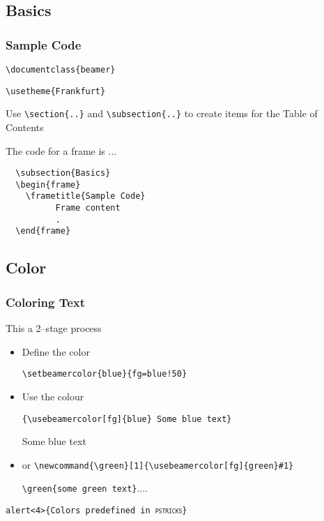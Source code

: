 \subsection{Basics}
\begin{frame}[fragile]
  \frametitle{Sample Code}
\verb+\documentclass{beamer}+
  
\verb+\usetheme{Frankfurt}+

  Use \verb+\section{..}+  and \verb+\subsection{..}+ to
create items for the Table of Contents

\alert<1>{The code for a frame is ...}
\begin{verbatim}
  \subsection{Basics}
  \begin{frame}
    \frametitle{Sample Code}
          Frame content
          .
  \end{frame}
\end{verbatim}
\end{frame}

\subsection{Color}

\begin{frame}[fragile]
  \frametitle{Coloring Text}
This a 2--stage process
\begin{itemize}
\item {\red Define} {\green the} {\blue color}

\verb+\setbeamercolor{blue}{fg=blue!50}+\pause
\item Use the colour

\verb+{\usebeamercolor[fg]{blue} Some blue text}+

	{ Some blue text}
\pause
\item or
{\small\verb+\newcommand{\green}[1]{\usebeamercolor[fg]{green}#1}+}

\verb+\green{some green text}+....

\end{itemize}

\alert<4>{\texttt{\bs alert<4>\{Colors predefined in \textsc{pstricks}\}}}
\end{frame}

